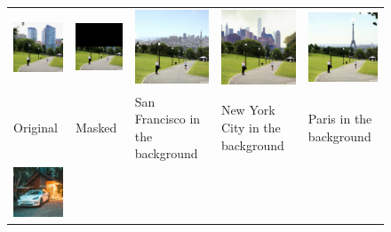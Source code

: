 \begin{figure}
  \centering
  \begin{tabular}{p{27mm}p{27mm}p{27mm}p{27mm}p{27mm}}
    \includegraphics[width=30mm]{figs/inpaint/15_orig} &
    \includegraphics[width=30mm]{figs/inpaint/15_masked} &
    \includegraphics[width=30mm]{figs/inpaint/14_synth_07} &
    \includegraphics[width=30mm]{figs/inpaint/12_synth_00} &
    \includegraphics[width=30mm]{figs/inpaint/15_synth_07} 
    \\
     Original &
     Masked &
    {San Francisco in the background} & 
    {New York City in the background} &
    {Paris in the background} 
    \\
    \includegraphics[width=30mm]{figs/inpaint/17_orig} &

\end{tabular}
\end{figure}
